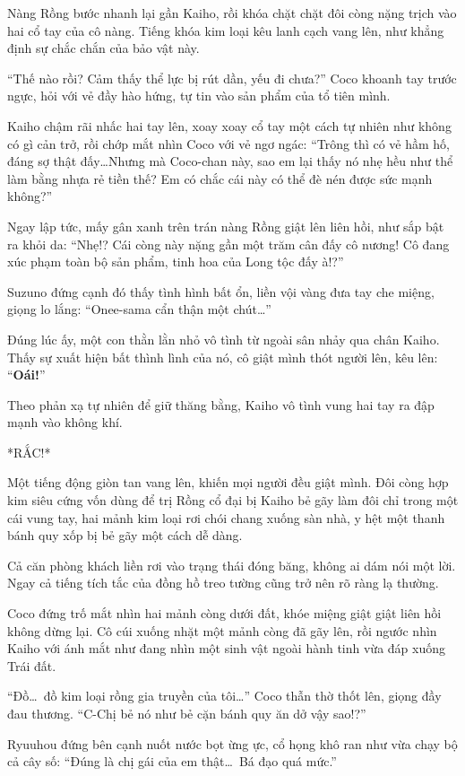 ﻿\documentclass[../main.tex]{subfiles}
\begin{document}
Nàng Rồng bước nhanh lại gần Kaiho, rồi khóa chặt chặt đôi còng nặng trịch vào hai cổ tay của cô nàng. Tiếng khóa kim loại kêu lanh cạch vang lên, như khẳng định sự chắc chắn của bảo vật này.

``Thế nào rồi? Cảm thấy thể lực bị rút dần, yếu đi chưa?'' Coco khoanh tay trước ngực, hỏi với vẻ đầy hào hứng, tự tin vào sản phẩm của tổ tiên mình.

Kaiho chậm rãi nhấc hai tay lên, xoay xoay cổ tay một cách tự nhiên như không có gì cản trở, rồi chớp mắt nhìn Coco với vẻ ngơ ngác: ``Trông thì có vẻ hầm hố, đáng sợ thật đấy\dots Nhưng mà Coco-chan này, sao em lại thấy nó nhẹ hều như thể làm bằng nhựa rẻ tiền thế? Em có chắc cái này có thể đè nén được sức mạnh không?''

Ngay lập tức, mấy gân xanh trên trán nàng Rồng giật lên liên hồi, như sắp bật ra khỏi da: ``Nhẹ!? Cái còng này nặng gần một trăm cân đấy cô nương! Cô đang xúc phạm toàn bộ sản phẩm, tinh hoa của Long tộc đấy à!?''

Suzuno đứng cạnh đó thấy tình hình bất ổn, liền vội vàng đưa tay che miệng, giọng lo lắng: ``Onee-sama cẩn thận một chút\dots''

Đúng lúc ấy, một con thằn lằn nhỏ vô tình từ ngoài sân nhảy qua chân Kaiho. Thấy sự xuất hiện bất thình lình của nó, cô giật mình thót người lên, kêu lên: ``\textbf{Oái!}''

Theo phản xạ tự nhiên để giữ thăng bằng, Kaiho vô tình vung hai tay ra đập mạnh vào không khí.

*RẮC!*

Một tiếng động giòn tan vang lên, khiến mọi người đều giật mình. Đôi còng hợp kim siêu cứng vốn dùng để trị Rồng cổ đại bị Kaiho bẻ gãy làm đôi chỉ trong một cái vung tay, hai mảnh kim loại rơi chói chang xuống sàn nhà, y hệt một thanh bánh quy xốp bị bẻ gãy một cách dễ dàng.

Cả căn phòng khách liền rơi vào trạng thái đóng băng, không ai dám nói một lời. Ngay cả tiếng tích tắc của đồng hồ treo tường cũng trở nên rõ ràng lạ thường.

Coco đứng trố mắt nhìn hai mảnh còng dưới đất, khóe miệng giật giật liên hồi không dừng lại. Cô cúi xuống nhặt một mảnh còng đã gãy lên, rồi ngước nhìn Kaiho với ánh mắt như đang nhìn một sinh vật ngoài hành tinh vừa đáp xuống Trái đất.

``Đồ\dots\ đồ kim loại rồng gia truyền của tôi\dots'' Coco thẫn thờ thốt lên, giọng đầy đau thương. ``C-Chị bẻ nó như bẻ cặn bánh quy ăn dở vậy sao!?''

Ryuuhou đứng bên cạnh nuốt nước bọt ừng ực, cổ họng khô ran như vừa chạy bộ cả cây số: ``Đúng là chị gái của em thật\dots\ Bá đạo quá mức.''
\end{document}
